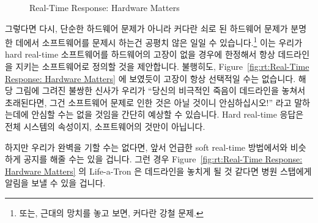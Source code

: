 \begin{figure}[bt]
\centering
{}
\caption{Real-Time Response: Hardware Matters}
\end{figure}

그렇다면 다시, 단순한 하드웨어 문제가 아니라 커다란 쇠로 된 하드웨어 문제가
분명한 데에서 소프트웨어를 문제시 하는건 공평치 않은 일일 수
있습니다.\footnote{
	또는, 근대의 망치를 놓고 보면, 커다란 강철 문제.}
이는 우리가 hard real-time 소프트웨어를 하드웨어의 고장이 없을 경우에 한정해서
항상 데드라인을 지키는 소프트웨어로 정의할 것을 제안합니다.
불행히도,
Figure~\ref{fig:rt:Real-Time Response: Hardware Matters} 에 보였듯이 고장이
항상 선택적일 수는 없습니다.
해당 그림에 그려진 불쌍한 신사가 우리가 ``당신의 비극적인 죽음이 데드라인을
놓쳐서 초래된다면, 그건 소프트웨어 문제로 인한 것은 아닐 것이니 안심하십시오!''
라고 말하는데에 안심할 수는 없을 것임을 간단히 예상할 수 있습니다.
Hard real-time 응답은 전체 시스템의 속성이지, 소프트웨어의 것만이 아닙니다.

하지만 우리가 완벽을 기할 수는 없다면, 앞서 언급한 soft real-time 방법에서와
비슷하게 공지를 해줄 수는 있을 겁니다.
그런 경우
Figure~\ref{fig:rt:Real-Time Response: Hardware Matters} 의 Life-a-Tron 은
데드라인을 놓치게 될 것 같다면 병원 스탭에게 알림을 보낼 수 있을 겁니다.

